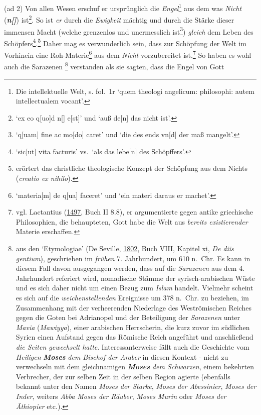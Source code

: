 \documentclass[
]{article}
\begin{document}
(ad 2) Von allen Wesen erschuf er ursprünglich die
\emph{Engel}\footnote{Die intellektuelle Welt, s. fol.~1r `quem theologi
  angelicum: philosophi: autem intellectualem vocant'.} aus dem was
\emph{Nicht} (\textbf{\emph{n{[}{]}}}) ist\footnote{`ex eo q{[}uo{]}d
  n{[}{]} e{[}st{]}' und `auß de{[}n{]} das nicht ist'.}. So ist
\emph{er} durch die \emph{Ewigkeit} mächtig und durch die Stärke dieser
immensen Macht (welche grenzenlos und unermesslich ist\footnote{`q{[}uam{]}
  fine ac mo{[}do{]} caret' und `die des ends vn{[}d{]} der maß
  mangelt'.}) \emph{gleich} dem Leben des
Schöpfers\footnote{`sic{[}ut{]} vita facturis' vs.~`als das lebe{[}n{]}
  des Schöpffers'.}.\footnote{erörtert das christliche theologische
  Konzept der Schöpfung aus dem Nichts (\emph{creatio ex nihilo}).}
Daher mag es verwunderlich sein, dass zur Schöpfung der Welt im
Vorhinein eine Roh-Materie\footnote{`materia{[}m{]} de q{[}ua{]}
  faceret' und `ein materi daraus er machet'.} aus dem \emph{Nicht}
vorzubereitet ist.\footnote{vgl. Lactantius
  (\href{https://books.google.com/books?id=qGsnghsi3uUC}{1497}, Buch II
  8.8), er argumentierte gegen antike griechische Philosophien, die
  behaupteten, Gott habe die Welt aus \emph{bereits existierender}
  Materie erschaffen.} So haben es wohl auch die Sarazenen \footnote{aus
  den `Etymologiae' (De Seville,
  \href{https://books.google.com/books?id=wb8Z_vlSyJwC}{1802}, Buch
  VIII, Kapitel xi, \emph{De diis gentium}), geschrieben im
  \emph{frühen} 7. Jahrhundert, um 610 n.~Chr. Es kann in diesem Fall
  davon ausgegangen werden, dass auf die \emph{Sarazenen} aus dem 4.
  Jahrhundert referiert wird, nomadische Stämme der syrisch-arabischen
  Wüste und es sich daher nicht um einen Bezug zum \emph{Islam} handelt.
  Vielmehr scheint es sich auf die \emph{weichenstellenden} Ereignisse
  um 378 n.~Chr. zu beziehen, im Zusammenhang mit der verheerenden
  Niederlage des Weströmischen Reiches gegen die Goten bei Adrianopel
  und der Beteiligung der \emph{Sarazenen} unter \emph{Mavia}
  (\emph{Mawiyya}), einer arabischen Herrscherin, die kurz zuvor im
  südlichen Syrien einen Aufstand gegen das Römische Reich angeführt und
  anschließend \emph{die Seiten gewechselt hatte}. Interessanterweise
  fällt auch die Geschichte vom \emph{Heiligen} \textbf{\emph{Moses}}
  \emph{dem Bischof der Araber} in diesen Kontext - nicht zu verwechseln
  mit dem gleichnamigen \textbf{\emph{Moses}} \emph{dem Schwarzen},
  einem bekehrten Verbrecher, der zur selben Zeit in der selben Region
  agierte (ebenfalls bekannt unter den Namen \emph{Moses der Starke},
  \emph{Moses der Abessinier}, \emph{Moses der Inder}, weiters
  \emph{Abba Moses der Räuber}, \emph{Moses Murin} oder \emph{Moses der
  Äthiopier} etc.).} verstanden als sie sagten, dass die Engel von Gott
\end{document}
